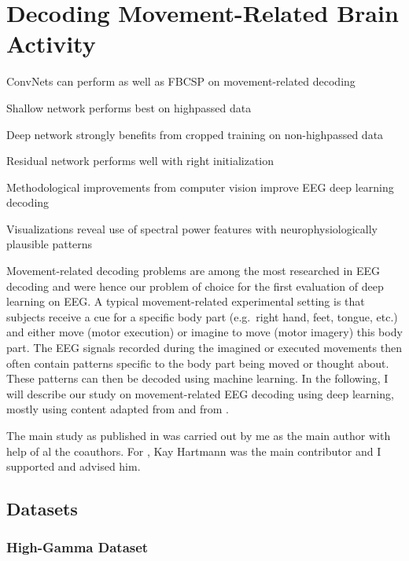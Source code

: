 \chapter{Decoding Movement-Related Brain Activity}\label{movement-related}
\begin{startbox}{ConvNets can perform as well as FBCSP on movement-related decoding}
\item Shallow network performs best on highpassed data
\item Deep network strongly benefits from cropped training on non-highpassed data
\item Residual network performs well with right initialization
\item Methodological improvements from computer vision improve EEG deep learning decoding
\item Visualizations reveal use of spectral power features with neurophysiologically plausible patterns
\end{startbox}

    Movement-related decoding problems are among the most researched in EEG
decoding and were hence our problem of choice for the first evaluation
of deep learning on EEG. A typical movement-related experimental setting
is that subjects receive a cue for a specific body part (e.g.~right
hand, feet, tongue, etc.) and either move (motor execution) or imagine
to move (motor imagery) this body part. The EEG signals recorded during
the imagined or executed movements then often contain patterns specific
to the body part being moved or thought about. These patterns can then
be decoded using machine learning. In the following, I will describe our
study on movement-related EEG decoding using deep learning, mostly using
content adapted from \citet{schirrmeisterdeephbm2017} and
from \citep{hartmann2018hierarchical}. 

The main study as published in \citet{schirrmeisterdeephbm2017} was carried out
by me as the main author with help of al the coauthors. For
\citet{hartmann2018hierarchical}, Kay Hartmann was the main
contributor and I supported and advised him.

\section{Datasets}\label{datasets}

\subsection{High-Gamma Dataset}\label{high-gamma-dataset}

